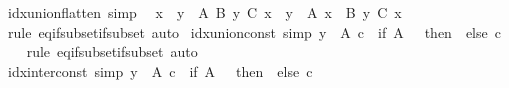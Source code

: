 \begin{isabellebody}
\ idx{\isacharunderscore}{\kern0pt}union{\isacharunderscore}{\kern0pt}flatten\ {\isacharbrackleft}{\kern0pt}simp{\isacharbrackright}{\kern0pt}{\isacharcolon}{\kern0pt}\isanewline
\ \ {\isachardoublequoteopen}{\isacharparenleft}{\kern0pt}{\isasymUnion}x\ {\isasymin}\ {\isacharparenleft}{\kern0pt}{\isasymUnion}y\ {\isasymin}\ A{\isachardot}{\kern0pt}\ B\ y{\isacharparenright}{\kern0pt}{\isachardot}{\kern0pt}\ C\ x{\isacharparenright}{\kern0pt}\ {\isacharequal}{\kern0pt}\ {\isacharparenleft}{\kern0pt}{\isasymUnion}y\ {\isasymin}\ A{\isachardot}{\kern0pt}\ {\isasymUnion}x\ {\isasymin}\ B\ y{\isachardot}{\kern0pt}\ C\ x{\isacharparenright}{\kern0pt}{\isachardoublequoteclose}\isanewline
%
\isadelimproof
\ \ %
\endisadelimproof
%
\isatagproof
{}\isamarkupfalse%
\ {\isacharparenleft}{\kern0pt}rule\ eq{\isacharunderscore}{\kern0pt}if{\isacharunderscore}{\kern0pt}subset{\isacharunderscore}{\kern0pt}if{\isacharunderscore}{\kern0pt}subset{\isacharparenright}{\kern0pt}\ auto%
\endisatagproof
{\isafoldproof}%
%
\isadelimproof
\isanewline
%
\endisadelimproof
\isanewline
{}\isamarkupfalse%
\ idx{\isacharunderscore}{\kern0pt}union{\isacharunderscore}{\kern0pt}const\ {\isacharbrackleft}{\kern0pt}simp{\isacharbrackright}{\kern0pt}{\isacharcolon}{\kern0pt}\ {\isachardoublequoteopen}{\isacharparenleft}{\kern0pt}{\isasymUnion}y\ {\isasymin}\ A{\isachardot}{\kern0pt}\ c{\isacharparenright}{\kern0pt}\ {\isacharequal}{\kern0pt}\ {\isacharparenleft}{\kern0pt}if\ A\ {\isacharequal}{\kern0pt}\ {\isacharbraceleft}{\kern0pt}{\isacharbraceright}{\kern0pt}\ then\ {\isacharbraceleft}{\kern0pt}{\isacharbraceright}{\kern0pt}\ else\ c{\isacharparenright}{\kern0pt}{\isachardoublequoteclose}\isanewline
%
\isadelimproof
\ \ %
\endisadelimproof
%
\isatagproof
{}\isamarkupfalse%
\ {\isacharparenleft}{\kern0pt}rule\ eq{\isacharunderscore}{\kern0pt}if{\isacharunderscore}{\kern0pt}subset{\isacharunderscore}{\kern0pt}if{\isacharunderscore}{\kern0pt}subset{\isacharparenright}{\kern0pt}\ auto%
\endisatagproof
{\isafoldproof}%
%
\isadelimproof
\isanewline
%
\endisadelimproof
\isanewline
{}\isamarkupfalse%
\ idx{\isacharunderscore}{\kern0pt}inter{\isacharunderscore}{\kern0pt}const\ {\isacharbrackleft}{\kern0pt}simp{\isacharbrackright}{\kern0pt}{\isacharcolon}{\kern0pt}\ {\isachardoublequoteopen}{\isacharparenleft}{\kern0pt}{\isasymInter}y\ {\isasymin}\ A{\isachardot}{\kern0pt}\ c{\isacharparenright}{\kern0pt}\ {\isacharequal}{\kern0pt}\ {\isacharparenleft}{\kern0pt}if\ A\ {\isacharequal}{\kern0pt}\ {\isacharbraceleft}{\kern0pt}{\isacharbraceright}{\kern0pt}\ then\ {\isacharbraceleft}{\kern0pt}{\isacharbraceright}{\kern0pt}\ else\ c{\isacharparenright}{\kern0pt}{\isachardoublequoteclose}\isanewline

\end{isabellebody}

